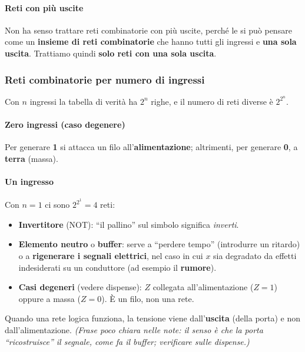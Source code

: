 \documentclass[11pt,a4paper]{article}
\begin{document}
\paragraph*{Reti con più uscite}

\begin{nota}[Importante]
Non ha senso trattare reti combinatorie con più uscite, perché le si può pensare come un \textbf{insieme di reti combinatorie} che hanno tutti gli ingressi e \textbf{una sola uscita}. Trattiamo quindi \textbf{solo reti con una sola uscita}.
\end{nota}

\subsubsection*{Reti combinatorie per numero di ingressi}

Con $n$ ingressi la tabella di verità ha $2^n$ righe, e il numero di reti diverse è $2^{2^n}$.

\paragraph*{Zero ingressi (caso degenere)}

Per generare \textbf{1} si attacca un filo all'\textbf{alimentazione}; altrimenti, per generare \textbf{0}, a \textbf{terra} (massa).

\paragraph*{Un ingresso}

Con $n=1$ ci sono $2^{2^1}=4$ reti:
\begin{itemize}[leftmargin=*]
  \item \textbf{Invertitore} (NOT): ``il pallino'' sul simbolo significa \emph{inverti}.
  \item \textbf{Elemento neutro} o \textbf{buffer}: serve a ``perdere tempo'' (introdurre un ritardo) o a \textbf{rigenerare i segnali elettrici}, nel caso in cui $x$ sia degradato da effetti indesiderati su un conduttore (ad esempio il \textbf{rumore}).
  \item \textbf{Casi degeneri} (vedere dispense): $Z$ collegata all'alimentazione ($Z=1$) oppure a massa ($Z=0$). È un filo, non una rete.
\end{itemize}

\begin{nota}
Quando una rete logica funziona, la tensione viene dall'\textbf{uscita} (della porta) e non dall'alimentazione. \emph{(Frase poco chiara nelle note: il senso è che la porta ``ricostruisce'' il segnale, come fa il buffer; verificare sulle dispense.)}
\end{nota}
\end{document}
